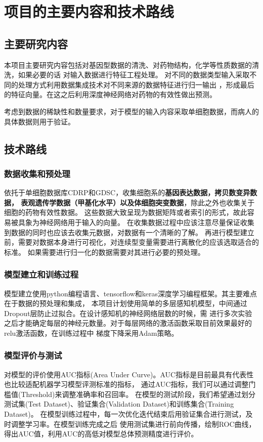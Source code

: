 \section{项目的主要内容和技术路线}

\subsection{主要研究内容}
本项目主要研究内容包括对基因型数据的清洗、对药物结构，化学等性质数据的清洗，如果必要的话
对输入数据进行特征工程处理。
对不同的数据类型输入采取不同的处理方式利用数据集成技术对不同来源的数据特征进行归一输出
，形成最后的特征向量。在这之后利用深度神经网络对药物的有效性做出预测。

考虑到数据的稀缺性和数量要求，对于模型的输入内容采取单细胞数据，而病人的具体数据则用于验证。


\subsection{技术路线}
\subsubsection{数据收集和预处理}
依托于单细胞数据库CDRP和GDSC，收集细胞系的\textbf{基因表达数据，拷贝数变异数据，
表观遗传学数据（甲基化水平）以及体细胞突变数据}，除此之外也收集关于细胞的药物有效性数据。
这些数据大致呈现为数据矩阵或者索引的形式，故此容易被具象为神经网络用于输入的向量。
在收集数据过程中应该注意尽量保证收集到数据的同时也应该去收集元数据，对数据有一个清晰的了解。
再进行模型建立前，需要对数据本身进行可视化，对连续型变量需要进行离散化的应该选取适合的标准。
如果需要进行归一化的数据需要对其进行必要的预处理。

\subsubsection{模型建立和训练过程}
模型建立使用python编程语言、tensorflow和keras深度学习编程框架。其主要难点在于数据的预处理和集成，
本项目计划使用简单的多层感知机模型，中间通过Dropout层防止过拟合。在设计感知机的神经网络层数的时候，需
进行多次实验之后才能确定每层的神经元数量。对于每层网络的激活函数采取目前效果最好的relu激活函数，在训练过程中
梯度下降采用Adam策略。

\subsubsection{模型评价与测试}
对模型的评价使用AUC指标(Area Under Curve)。AUC指标是目前最具有代表性也比较适配机器学习模型评测标准的指标，
通过AUC指标，我们可以通过调整门槛值(Threshold)来调整准确率和召回率。
在模型的测试阶段，我们希望通过划分测试集(Test Dataset)、验证集合(Validation Dataset)和训练集合(Training Dataset)。
在模型训练过程中，每一次优化迭代结束后用验证集合进行测试，及时调整学习率。在模型训练完成之后
使用测试集进行前向传播，绘制ROC曲线，得出AUC值，利用AUC的高低对模型总体预测精度进行评价。

